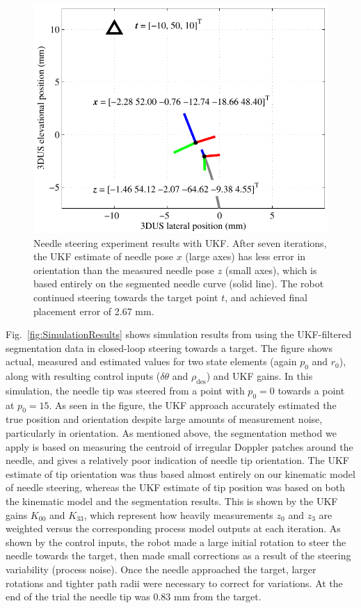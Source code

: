 \begin{figure}[!t]
\centering
\includegraphics[width=0.7\columnwidth]{Images/Chapter4/ExperimentalResults/ExperimentalResults}%
\caption[Needle steering experiment results with UKF]{Needle steering experiment results with UKF. After seven iterations, the UKF estimate of needle pose ${x}$ (large axes) has less error in orientation than the measured needle pose ${z}$ (small axes), which is based entirely on the segmented needle curve (solid line). The robot continued steering towards the target point ${t}$, and achieved final placement error of 2.67 mm.}
\label{fig:ExperimentalResults}
\end{figure}

Fig.~\ref{fig:SimulationResults} shows simulation results from using the UKF-filtered segmentation data in closed-loop steering towards a target. The figure shows actual, measured and estimated values for two state elements (again $p_0$ and $r_0$), along with resulting control inputs ($\delta\theta$ and $\rho_\text{des}$) and UKF gains. In this simulation, the needle tip was steered from a point with $p_0 = 0$ towards a point at $p_0 = 15$. As seen in the figure, the UKF approach accurately estimated the true position and orientation despite large amounts of measurement noise, particularly in orientation. As mentioned above, the segmentation method we apply is based on measuring the centroid of irregular Doppler patches around the needle, and gives a relatively poor indication of needle tip orientation. The UKF estimate of tip orientation was thus based almost entirely on our kinematic model of needle steering, whereas the UKF estimate of tip position was based on both the kinematic model and the segmentation results. This is shown by the UKF gains $K_{00}$ and $K_{33}$, which represent how heavily measurements $z_0$ and $z_3$ are weighted versus the corresponding process model outputs at each iteration. As shown by the control inputs, the robot made a large initial rotation to steer the needle towards the target, then made small corrections as a result of the steering variability (process noise). Once the needle approached the target, larger rotations and tighter path radii were necessary to correct for variations. At the end of the trial the needle tip was 0.83 mm from the target.    

